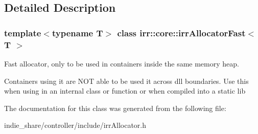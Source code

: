 \subsection{Detailed Description}
\subsubsection*{template$<$typename T$>$\newline
class irr\+::core\+::irr\+Allocator\+Fast$<$ T $>$}

Fast allocator, only to be used in containers inside the same memory heap. 

Containers using it are N\+OT able to be used it across dll boundaries. Use this when using in an internal class or function or when compiled into a static lib 

The documentation for this class was generated from the following file\+:\begin{DoxyCompactItemize}
\item 
indie\+\_\+share/controller/include/irr\+Allocator.\+h\end{DoxyCompactItemize}
